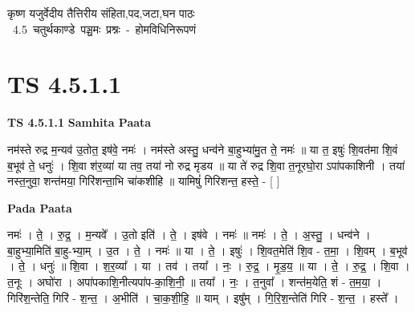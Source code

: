 \documentclass[17pt]{extarticle}
\begin{document}
\begin{titlepage}
    \begin{center}
 
\begin{sanskrit}
    { \Large
    कृष्ण यजुर्वेदीय तैत्तिरीय संहिता,पद,जटा,घन पाठः 
    }
    \\
    \vspace{2.5cm}
    \mbox{ \Large
    4.5      चतुर्थकाण्डे पञ्चमः प्रश्नः - होमविधिनिरूपणं   }
\end{sanskrit}
\end{center}

\end{titlepage}
\tableofcontents
{}
\pagebreak


\section{ TS 4.5.1.1 }

\textbf{TS 4.5.1.1 } \newline
\textbf{Samhita Paata} \newline

नम॑स्ते रुद्र म॒न्यव॑ उ॒तोत॒ इष॑वे॒ नमः॑ । नम॑स्ते अस्तु॒ धन्व॑ने बा॒हुभ्या॑मु॒त ते॒ नमः॑ ॥                                   या त॒ इषुः॑ शि॒वत॑मा शि॒वं ब॒भूव॑ ते॒ धनुः॑ । शि॒वा श॑र॒व्या॑ या तव॒ तया॑ नो रुद्र मृडय ॥     या ते॑ रुद्र शि॒वा त॒नूरघो॒रा ऽपा॑पकाशिनी । तया॑ नस्त॒नुवा॒ शन्त॑मया॒ गिरि॑शन्ता॒भि चा॑कशीहि ॥                                यामिषुं॑ गिरिशन्त॒ हस्ते॒ - [  ] \newline

\textbf{Pada Paata} \newline

नमः॑ । ते॒ । रु॒द्र॒ । म॒न्यवे᳚ । उ॒तो इति॑ । ते॒ । इष॑वे । नमः॑ ॥ नमः॑ । ते॒ । अ॒स्तु॒ । धन्व॑ने । बा॒हुभ्या॒मिति॑ बा॒हु-भ्या॒म् । उ॒त । ते॒ । नमः॑ ॥ या । ते॒ । इषुः॑ । शि॒वत॒मेति॑ शि॒व - त॒मा॒ । शि॒वम् । ब॒भूव॑ । ते॒ । धनुः॑ ॥ शि॒वा । श॒र॒व्या᳚ । या । तव॑ । तया᳚ । नः॒ । रु॒द्र॒ । मृ॒ड॒य॒ ॥ या । ते॒ । रु॒द्र॒ । शि॒वा । त॒नूः । अघो॑रा । अपा॑पकाशि॒नीत्यपा॑प-का॒शि॒नी॒ ॥ तया᳚ । नः॒ । त॒नुवा᳚ । शन्त॑म॒येति॒ शं - त॒म॒या॒ । गिरि॑श॒न्तेति॒ गिरि॑ - श॒न्त॒ । अ॒भीति॑ । चा॒क॒शी॒हि॒ ॥ याम् । इषु᳚म् । गि॒रि॒श॒न्तेति॑ गिरि - श॒न्त॒ । हस्ते᳚ ।  \newline




\end{document}
